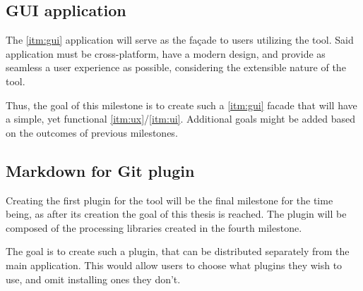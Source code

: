 \subsection*{GUI application} \label{subSecGuiApp}

The \ref{itm:gui} application will serve as the façade to users utilizing the tool. Said application must be cross-platform, have a modern design, and provide as seamless a user experience as possible, considering the extensible nature of the tool.

Thus, the goal of this milestone is to create such a \ref{itm:gui} facade that will have a simple, yet functional \ref{itm:ux}/\ref{itm:ui}. Additional goals might be added based on the outcomes of previous milestones.

\subsection*{Markdown for Git plugin} \label{subSecMdGitPlugin}

Creating the first plugin for the tool will be the final milestone for the time being, as after its creation the goal of this thesis is reached.
The plugin will be composed of the processing libraries created in the fourth milestone.

The goal is to create such a plugin, that can be distributed separately from the main application. This would allow users to choose what plugins they wish to use, and omit installing ones they don't.
